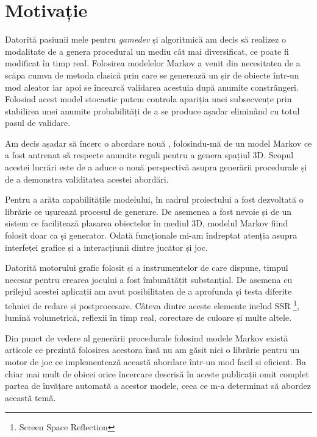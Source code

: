 \chapter*{Motivație} 

Datorită pasiunii mele pentru \textit{gamedev} și algoritmică am decis să realizez o modalitate de a genera procedural un mediu cât mai diversificat, ce poate fi modificat în timp real. Folosirea modelelor Markov a venit din necesitatea de a scăpa cumva de metoda clasică prin care se generează un șir de obiecte într-un mod aleator iar apoi se încearcă validarea acestuia după anumite constrângeri. Folosind acest model stocastic putem controla apariția unei subsecvențe prin stabilirea unei anumite probabilități de a se produce așadar eliminând cu totul pasul de validare.\par

Am decis așadar să încerc o abordare nouă , folosindu-mă de un model Markov ce a fost antrenat să respecte anumite reguli pentru a genera spațiul 3D. Scopul acestei lucrări este de a aduce o nouă perspectivă asupra generării procedurale și de a demonstra validitatea acestei abordări.\par

Pentru a arăta capabilitățile modelului, în cadrul proiectului a fost dezvoltată o librărie ce ușurează procesul de generare. De asemenea a fost nevoie și de un sistem ce facilitează plasarea obiectelor în mediul 3D, modelul Markov fiind folosit doar ca și generator. Odată funcționale mi-am îndreptat atenția asupra interfeței grafice și a interacțiunii dintre jucător și joc.\par

Datorită motorului grafic folosit și a instrumentelor de care dispune, timpul necesar pentru crearea jocului a fost îmbunătățit substanțial. De asemena cu prilejul acestei aplicații am avut posibilitatea de a aprofunda și testa diferite tehnici de redare și postprocesare. Câteva dintre aceste elemente includ SSR \footnote{Screen Space Reflection}, lumină volumetrică, reflexii în timp real, corectare de culoare și multe altele.\par

Din punct de vedere al generării procedurale folosind modele Markov există articole ce prezintă folosirea acestora însă nu am găsit nici o librărie pentru un motor de joc ce implementează această abordare într-un mod facil și eficient. Ba chiar mai mult de obicei orice încercare descrisă în aceste publicații omit complet partea de învățare automată a acestor modele, ceea ce m-a determinat să abordez această temă.\par

